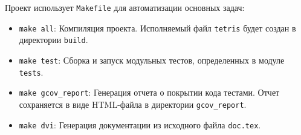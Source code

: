 \documentclass[12pt, a4paper]{article}
\begin{document}
Проект использует \texttt{Makefile} для автоматизации основных задач:
\begin{itemize}
    \item \texttt{make all}: Компиляция проекта. Исполняемый файл \texttt{tetris} будет создан в директории \texttt{build}.
    \item \texttt{make test}: Сборка и запуск модульных тестов, определенных в модуле \texttt{tests}.
    \item \texttt{make gcov\_report}: Генерация отчета о покрытии кода тестами. Отчет сохраняется в виде HTML-файла в директории \texttt{gcov\_report}.
    \item \texttt{make dvi}: Генерация документации из исходного файла \texttt{doc.tex}.
\end{itemize}
\end{document}
